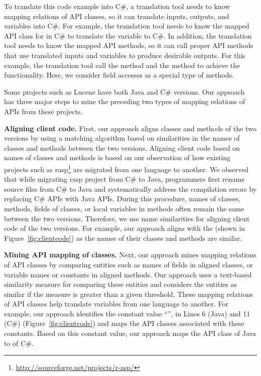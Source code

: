 To translate this code example into C\#, a translation tool needs to
know mapping relations of API classes, so it can translate inputs,
outputs, and variables into C\#. For example, the translation tool
needs to know the mapped API class for  in C\#
to translate the variable  to C\#. In addition, the
translation tool needs to know the mapped API methods, so it can
call proper API methods that use translated inputs and variables to
produce desirable outputs. For this example, the translation tool
call the  method and the  method to
achieve the functionality. Here, we consider field accesses as a
special type of methods.

Some projects such as Lucene have both Java and C\# versions. Our
approach has three major steps to mine the preceding two types of
mapping relations of APIs from these projects.

\textbf{Aligning client code.} First, our approach aligns classes
and methods of the two versions by using a matching algorithm based
on similarities in the names of classes and methods between the two
versions. Aligning client code based on names of classes and methods
is based on our observation of how existing projects such as
rasp\footnote{\url{http://sourceforge.net/projects/r-asp/}} are
migrated from one language to another. We observed that while
migrating rasp project from C\# to Java, programmers first rename
source files from C\# to Java and systematically address the
compilation errors by replacing C\# APIs with Java APIs. During this
procedure, names of classes, methods, fields of classes, or local
variables in methods often remain the same between the two versions.
Therefore, we use name similarities for aligning client code of the
two versions. For example, our approach aligns
 with the  (shown in
Figure~\ref{fig:clientcode}) as the names of their classes and
methods are similar.

\textbf{Mining API mapping of classes.} Next, our approach
mines mapping relations of API classes by comparing entities such as
names of fields in aligned classes, or variable names or constants
in aligned methods. Our approach uses a text-based similarity
measure for comparing these entities and considers the entities as
similar if the measure is greater than a given threshold. These
mapping relations of API classes help translate variables from one
language to another. For example, our approach identifies the
constant value ``'', in Lines 6 (Java) and 11 (C\#)
(Figure~\ref{fig:clientcode}) and maps the API classes associated
with these constants. Based on this constant value, our approach maps
the API class  of Java to
 of C\#.

